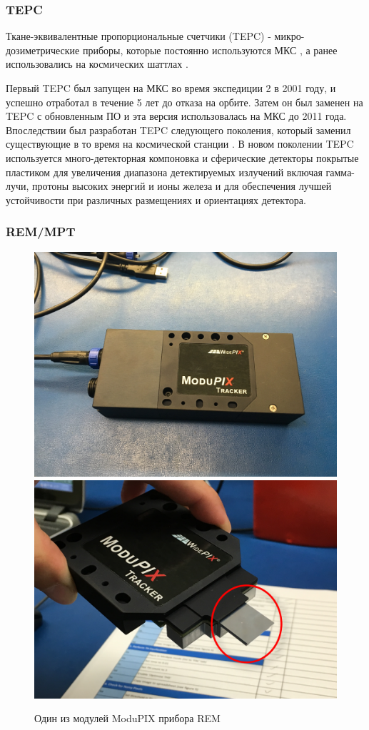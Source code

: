 \subsubsection{TEPC}

Ткане-эквивалентные пропорциональные счетчики (TEPC) - микро-дозиметрические приборы, которые постоянно используются МКС \cite{Perez-Nunez2011}, а ранее использовались на космических шаттлах \cite{Badhwar2002}.


Первый TEPC был запущен на МКС во время экспедиции 2 в 2001 году, и успешно отработал в течение 5 лет до отказа на орбите. Затем он был заменен на TEPC с обновленным ПО и эта версия использовалась на МКС до 2011 года. Впоследствии был разработан  TEPC следующего поколения, который заменил существующие в то время на космической станции \cite{Perez-Nunez2011}. В новом поколении TEPC используется много-детекторная компоновка и сферические детекторы покрытые   пластиком для увеличения диапазона детектируемых излучений включая гамма-лучи, протоны высоких энергий и ионы железа и для обеспечения лучшей устойчивости при различных размещениях и ориентациях детектора.

\subsubsection{REM/MPT}
\begin{figure}
	\centering
	\includegraphics[width=0.49\linewidth]{images/remmodupix}
	\includegraphics[width=0.49\linewidth]{images/modupix}
	\caption{Один из модулей ModuPIX прибора REM}
	\label{fig:modupix}
\end{figure}



